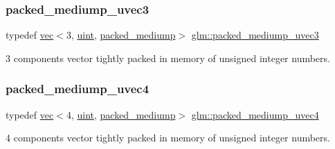 \subsubsection{\texorpdfstring{packed\+\_\+mediump\+\_\+uvec3}{packed\_mediump\_uvec3}}
{\footnotesize\ttfamily typedef \mbox{\hyperlink{structglm_1_1vec}{vec}}$<$3, \mbox{\hyperlink{group__core__precision_ga4fd29415871152bfb5abd588334147c8}{uint}}, \mbox{\hyperlink{namespaceglm_a36ed105b07c7746804d7fdc7cc90ff25a9604654c3b137cd7898689fd34b25bc0}{packed\+\_\+mediump}}$>$ \mbox{\hyperlink{group__gtc__type__aligned_gaa79317c123076b994c5c1b46a5b41351}{glm\+::packed\+\_\+mediump\+\_\+uvec3}}}



3 components vector tightly packed in memory of unsigned integer numbers. 

\mbox{\label{group__gtc__type__aligned_ga228b9899ea277eb8655d01c754e1ee64}} 
\subsubsection{\texorpdfstring{packed\+\_\+mediump\+\_\+uvec4}{packed\_mediump\_uvec4}}
{\footnotesize\ttfamily typedef \mbox{\hyperlink{structglm_1_1vec}{vec}}$<$4, \mbox{\hyperlink{group__core__precision_ga4fd29415871152bfb5abd588334147c8}{uint}}, \mbox{\hyperlink{namespaceglm_a36ed105b07c7746804d7fdc7cc90ff25a9604654c3b137cd7898689fd34b25bc0}{packed\+\_\+mediump}}$>$ \mbox{\hyperlink{group__gtc__type__aligned_ga228b9899ea277eb8655d01c754e1ee64}{glm\+::packed\+\_\+mediump\+\_\+uvec4}}}



4 components vector tightly packed in memory of unsigned integer numbers. 

\mbox{\label{group__gtc__type__aligned_gadf62fccc1514b0dca7ab1067263fca4c}} 

